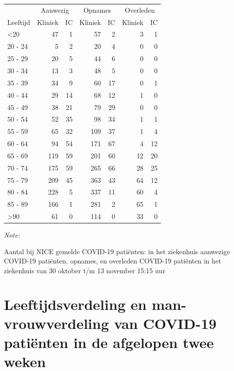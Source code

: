 \documentclass[
  english,
  man,floatsintext]{apa6}
\begin{document}
\begin{table}
\centering\begingroup\fontsize{10}{12}\selectfont

\begin{threeparttable}
\begin{tabular}{lrrrrrr}
\toprule
\multicolumn{1}{c}{ } & \multicolumn{2}{c}{Aanwezig} & \multicolumn{2}{c}{Opnames} & \multicolumn{2}{c}{Overleden} \\
\cmidrule(l{3pt}r{3pt}){2-3} \cmidrule(l{3pt}r{3pt}){4-5} \cmidrule(l{3pt}r{3pt}){6-7}
Leeftijd & Kliniek & IC & Kliniek & IC & Kliniek & IC\\
\midrule
<20 & 47 & 1 & 57 & 2 & 3 & 1\\
20 - 24 & 5 & 2 & 20 & 4 & 0 & 0\\
25 - 29 & 20 & 5 & 44 & 6 & 0 & 0\\
30 - 34 & 13 & 3 & 48 & 5 & 0 & 0\\
35 - 39 & 34 & 9 & 60 & 17 & 0 & 1\\
40 - 44 & 29 & 14 & 68 & 12 & 1 & 0\\
45 - 49 & 38 & 21 & 79 & 29 & 0 & 0\\
50 - 54 & 52 & 35 & 98 & 34 & 1 & 1\\
55 - 59 & 65 & 32 & 109 & 37 & 1 & 4\\
60 - 64 & 94 & 54 & 171 & 67 & 4 & 12\\
65 - 69 & 119 & 59 & 201 & 60 & 12 & 20\\
70 - 74 & 175 & 59 & 265 & 66 & 28 & 25\\
75 - 79 & 209 & 45 & 363 & 43 & 64 & 12\\
80 - 84 & 228 & 5 & 337 & 11 & 60 & 4\\
85 - 89 & 166 & 1 & 281 & 2 & 65 & 1\\
>90 & 61 & 0 & 114 & 0 & 33 & 0\\
\bottomrule
\end{tabular}
\begin{tablenotes}
\item \textit{Note: } 
\item Aantal bij NICE gemelde COVID-19 patiënten: in het ziekenhuis aanwezige COVID-19 patiënten, opnames, en overleden COVID-19 patiënten in het ziekenhuis van 30 oktober t/m 13 november 15:15 uur
\end{tablenotes}
\end{threeparttable}
\endgroup{}
\end{table}

\newpage

\hypertarget{leeftijdsverdeling-en-man-vrouwverdeling-van-covid-19-patiuxebnten-in-de-afgelopen-twee-weken}{%
\section{Leeftijdsverdeling en man-vrouwverdeling van COVID-19 patiënten in de afgelopen twee weken}\label{leeftijdsverdeling-en-man-vrouwverdeling-van-covid-19-patiuxebnten-in-de-afgelopen-twee-weken}}
\end{document}
